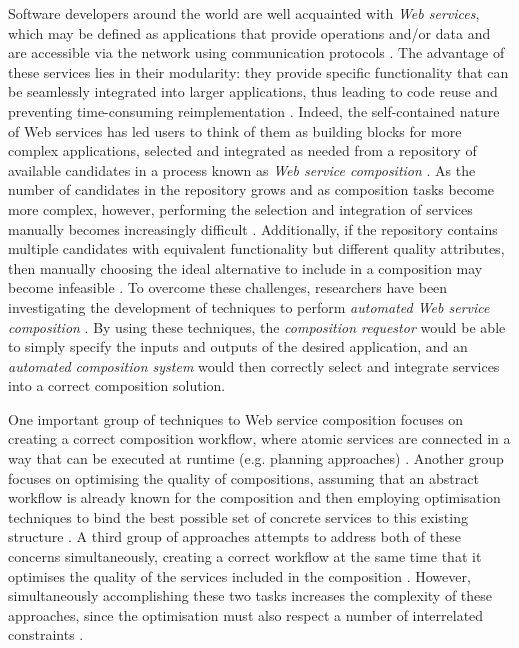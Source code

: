 \documentclass{llncs}
\begin{document}
Software developers around the world are well acquainted with \textit{Web services}, which may be defined as applications that provide operations and/or data and are accessible via the network using communication protocols \cite{gottschalk2002introduction}. The advantage of these services lies in their modularity: they provide specific functionality that can be seamlessly integrated into larger applications, thus leading to code reuse and preventing time-consuming reimplementation \cite{dustdar2008services}. Indeed, the self-contained nature of Web services has led users to think of them as building blocks for more complex applications, selected and integrated as needed from a repository of available candidates in a process known as \textit{Web service composition} \cite{dustdar2008services}. As the number of candidates in the repository grows and as composition tasks become more complex, however, performing the selection and integration of services manually becomes increasingly difficult \cite{lecue2006formal}. Additionally, if the repository contains multiple candidates with equivalent functionality but different quality attributes, then manually choosing the ideal alternative to include in a composition may become infeasible \cite{gronmo2005model}. To overcome these challenges, researchers have been investigating the development of techniques to perform \textit{automated Web service composition} \cite{milanovic2004current}. By using these techniques, the \textit{composition requestor} would be able to simply specify the inputs and outputs of the desired application, and an \textit{automated composition system} would then correctly select and integrate services into a correct composition solution.

One important group of techniques to Web service composition focuses on creating a correct composition workflow, where atomic services are connected in a way that can be executed at runtime (e.g. planning approaches) \cite{}. Another group focuses on optimising the quality of compositions, assuming that an abstract workflow is already known for the composition and then employing optimisation techniques to bind the best possible set of concrete services to this existing structure \cite{}. A third group of approaches attempts to address both of these concerns simultaneously, creating a correct workflow at the same time that it optimises the quality of the services included in the composition \cite{da2015graphevol}. However, simultaneously accomplishing these two tasks increases the complexity of these approaches, since the optimisation must also respect a number of interrelated constraints \cite{venkatraman2005generic}.
\end{document}
